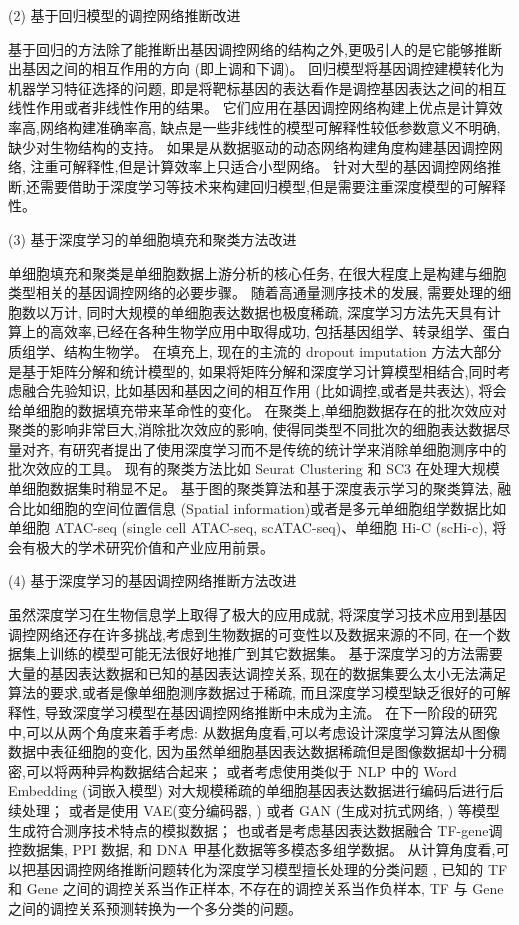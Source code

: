 (2) 基于回归模型的调控网络推断改进

基于回归的方法除了能推断出基因调控网络的结构之外,更吸引人的是它能够推断出基因之间的相互作用的方向 (即上调和下调)。
回归模型将基因调控建模转化为机器学习特征选择的问题,
即是将靶标基因的表达看作是调控基因表达之间的相互线性作用或者非线性作用的结果。
它们应用在基因调控网络构建上优点是计算效率高,网络构建准确率高,
缺点是一些非线性的模型可解释性较低参数意义不明确,缺少对生物结构的支持。
如果是从数据驱动的动态网络构建角度构建基因调控网络, 注重可解释性,但是计算效率上只适合小型网络。
针对大型的基因调控网络推断,还需要借助于深度学习等技术来构建回归模型,但是需要注重深度模型的可解释性。

(3) 基于深度学习的单细胞填充和聚类方法改进

单细胞填充和聚类是单细胞数据上游分析的核心任务, 
在很大程度上是构建与细胞类型相关的基因调控网络的必要步骤。
随着高通量测序技术的发展, 需要处理的细胞数以万计, 同时大规模的单细胞表达数据也极度稀疏,
深度学习方法先天具有计算上的高效率,已经在各种生物学应用中取得成功,
包括基因组学、转录组学、蛋白质组学、结构生物学。
在填充上, 现在的主流的 dropout imputation 方法大部分是基于矩阵分解和统计模型的,
如果将矩阵分解和深度学习计算模型相结合,同时考虑融合先验知识,
比如基因和基因之间的相互作用 (比如调控,或者是共表达),
将会给单细胞的数据填充带来革命性的变化。
在聚类上,单细胞数据存在的批次效应对聚类的影响非常巨大,消除批次效应的影响,
使得同类型不同批次的细胞表达数据尽量对齐,
有研究者提出了使用深度学习而不是传统的统计学来消除单细胞测序中的批次效应的工具。
现有的聚类方法比如 Seurat Clustering  和 SC3  在处理大规模单细胞数据集时稍显不足。
基于图的聚类算法和基于深度表示学习的聚类算法,
融合比如细胞的空间位置信息 (Spatial information)或者是多元单细胞组学数据比如
单细胞 ATAC-seq (single cell ATAC-seq, scATAC-seq)、单细胞 Hi-C (scHi-c), 
将会有极大的学术研究价值和产业应用前景。

(4) 基于深度学习的基因调控网络推断方法改进

虽然深度学习在生物信息学上取得了极大的应用成就,
将深度学习技术应用到基因调控网络还存在许多挑战,考虑到生物数据的可变性以及数据来源的不同,
在一个数据集上训练的模型可能无法很好地推广到其它数据集。
基于深度学习的方法需要大量的基因表达数据和已知的基因表达调控关系,
现在的数据集要么太小无法满足算法的要求,或者是像单细胞测序数据过于稀疏,
而且深度学习模型缺乏很好的可解释性,
导致深度学习模型在基因调控网络推断中未成为主流。
在下一阶段的研究中,可以从两个角度来着手考虑:
从数据角度看,可以考虑设计深度学习算法从图像数据中表征细胞的变化,
因为虽然单细胞基因表达数据稀疏但是图像数据却十分稠密,可以将两种异构数据结合起来；
或者考虑使用类似于 NLP 中的 Word Embedding (词嵌入模型) 对大规模稀疏的单细胞基因表达数据进行编码后进行后续处理；
或者是使用 VAE(变分编码器, ) 或者 GAN (生成对抗式网络, ) 等模型生成符合测序技术特点的模拟数据；
也或者是考虑基因表达数据融合 TF-gene调控数据集, PPI 数据, 和 DNA 甲基化数据等多模态多组学数据。
从计算角度看,可以把基因调控网络推断问题转化为深度学习模型擅长处理的分类问题 , 
已知的 TF 和 Gene 之间的调控关系当作正样本, 不存在的调控关系当作负样本,
TF 与 Gene 之间的调控关系预测转换为一个多分类的问题。